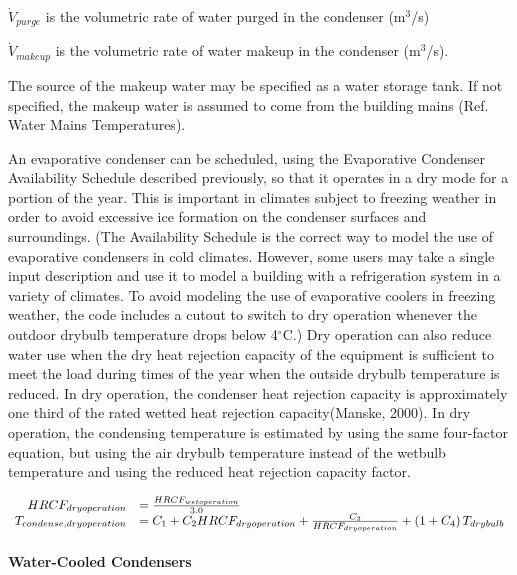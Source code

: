 \({\dot V_{purge}}\) is the volumetric rate of water purged in the condenser (m\(^{3}\)/s)

\({\dot V_{makeup}}\) is the volumetric rate of water makeup in the condenser (m\(^{3}\)/s).

The source of the makeup water may be specified as a water storage tank. If not specified, the makeup water is assumed to come from the building mains (Ref. Water Mains Temperatures).

An evaporative condenser can be scheduled, using the Evaporative Condenser Availability Schedule described previously, so that it operates in a dry mode for a portion of the year. This is important in climates subject to freezing weather in order to avoid excessive ice formation on the condenser surfaces and surroundings. (The Availability Schedule is the correct way to model the use of evaporative condensers in cold climates. However, some users may take a single input description and use it to model a building with a refrigeration system in a variety of climates. To avoid modeling the use of evaporative coolers in freezing weather, the code includes a cutout to switch to dry operation whenever the outdoor drybulb temperature drops below 4\(^{\circ}\)C.) Dry operation can also reduce water use when the dry heat rejection capacity of the equipment is sufficient to meet the load during times of the year when the outside drybulb temperature is reduced. In dry operation, the condenser heat rejection capacity is approximately one third of the rated wetted heat rejection capacity(Manske, 2000). In dry operation, the condensing temperature is estimated by using the same four-factor equation, but using the air drybulb temperature instead of the wetbulb temperature and using the reduced heat rejection capacity factor.

\begin{equation}
  \begin{array}{rl}
    HRCF_{dry operation} &= \frac{HRCF_{wet operation}}{3.0} \\
    T_{condense,dry operation} &= {C_1} + {C_2}{HRCF_{dry operation}} + \frac{C_3}{HRCF_{dry operation}} + \left(1 + C_4\right) T_{drybulb}
  \end{array}
\end{equation}

\paragraph{Water-Cooled Condensers}\label{water-cooled-condensers}

